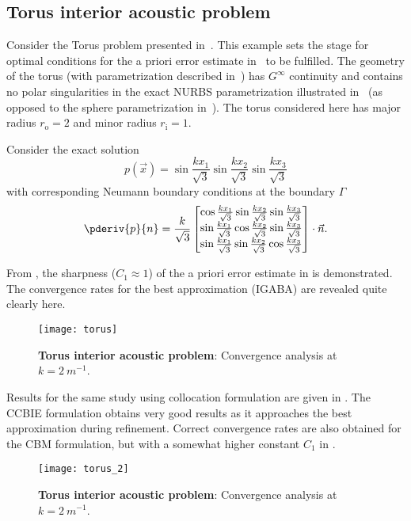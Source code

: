 \subsection{Torus interior acoustic problem}
Consider the Torus problem presented in~\cite{Simpson2014aib}. This example sets the stage for optimal conditions for the a priori error estimate in~ to be fulfilled. The geometry of the torus (with parametrization described in~) has $G^\infty$ continuity and contains no polar singularities in the exact NURBS parametrization illustrated in~ (as opposed to the sphere parametrization in~). The torus considered here has major radius $r_{\mathrm{o}} = 2$ and minor radius $r_{\mathrm{i}}=1$. 

Consider the exact solution
\begin{equation*}
	p(\vec{x}) = \sin\frac{kx_1}{\sqrt{3}}\sin\frac{kx_2}{\sqrt{3}}\sin\frac{kx_3}{\sqrt{3}}
\end{equation*}
with corresponding Neumann boundary conditions at the boundary $\Gamma$
\begin{equation*}
	\pderiv{p}{n} = \frac{k}{\sqrt{3}}\begin{bmatrix}
	\cos\frac{kx_1}{\sqrt{3}}\sin\frac{kx_2}{\sqrt{3}}\sin\frac{kx_3}{\sqrt{3}}\\
	\sin\frac{kx_1}{\sqrt{3}}\cos\frac{kx_2}{\sqrt{3}}\sin\frac{kx_3}{\sqrt{3}}\\
	\sin\frac{kx_1}{\sqrt{3}}\sin\frac{kx_2}{\sqrt{3}}\cos\frac{kx_3}{\sqrt{3}}
	\end{bmatrix}\cdot\vec{n}.
\end{equation*}

From , the sharpness ($C_1 \approx 1$) of the a priori error estimate in  is demonstrated. The convergence rates for the best approximation (IGABA) are revealed quite clearly here. 
\begin{figure}
	\centering
	\texttt{[image: torus]}
	\caption{\textbf{Torus interior acoustic problem}: Convergence analysis at $k=\SI{2}{m^{-1}}$.}
	\label{Fig3:torus}
\end{figure}

Results for the same study using collocation formulation are given in . The CCBIE formulation obtains very good results as it approaches the best approximation during refinement. Correct convergence rates are also obtained for the CBM formulation, but with a somewhat higher constant $C_1$ in .
\begin{figure}
	\centering
	\texttt{[image: torus\_2]}
	\caption{\textbf{Torus interior acoustic problem}: Convergence analysis at $k=\SI{2}{m^{-1}}$.}
	\label{Fig3:torus_2}
\end{figure}

